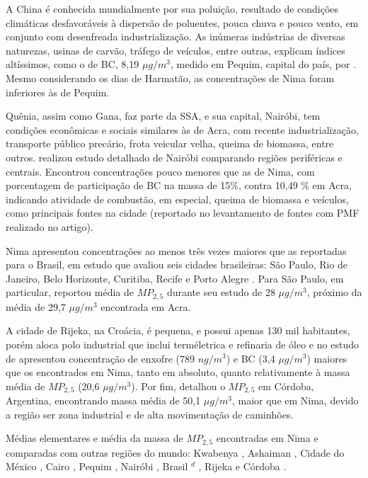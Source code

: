 A China é conhecida mundialmente por sua poluição, resultado de condições
climáticas desfavoráveis à dispersão de poluentes, pouca chuva e pouco vento, 
em conjunto com desenfreada industrialização. As inúmeras indústrias
de diversas naturezas, usinas de carvão, tráfego de veículos, entre outras, 
explicam índices altíssimos, como o de BC, 8,19 $\mu g/m^3$, 
medido em Pequim, capital do país, por \citet{yang2011}. Mesmo considerando 
os dias de Harmatão, as concentrações de Nima foram inferiores às de Pequim.

Quênia, assim como Gana, faz parte da SSA, e sua capital, Nairóbi, tem condições
econômicas e sociais similares às de Acra, com recente industrialização, 
transporte público precário, frota veicular velha, queima de biomassa, 
entre outros.  
\citet{gaita2014} realizou estudo detalhado de Nairóbi comparando regiões 
periféricas e centrais. Encontrou concentrações pouco menores que as de Nima, 
com porcentagem de participação de BC na massa de 15\%, contra 10,49 \% em Acra,
indicando atividade de combustão, em especial, queima de biomassa e veículos, 
como principais fontes na cidade 
(reportado no levantamento de fontes com PMF realizado no artigo). 

Nima apresentou concentrações ao menos três vezes maiores que as reportadas 
para o Brasil, em estudo que avaliou seis cidades brasileiras: São Paulo, 
Rio de Janeiro, Belo Horizonte, Curitiba, Recife e Porto Alegre
\citep{andrade2012urban}. Para São Paulo, em particular, \citet{andrade2012}
reportou média de $MP_{2,5}$ durante seu estudo de 28 $\mu g / m^3$, 
próximo da média de 29,7 $\mu g / m^3$ encontrada em Acra. 

A cidade de Rijeka, na Croácia, é pequena, e possui apenas 130 mil habitantes, 
porém aloca polo industrial que inclui terméletrica e refinaria de óleo
e no estudo de \citet{ivovsevic2015} apresentou concentração de enxofre
(789 $ng / m^3$) e BC (3,4 $\mu g / m^3$) maiores que os encontrados em Nima, 
tanto em absoluto, quanto relativamente à massa média de $MP_{2,5}$ 
(20,6 $\mu g / m^3$). 
Por fim, \citet{achad2014} detalhou o $MP_{2,5}$ em Córdoba, Argentina, 
encontrando massa média de 50,1 $\mu g / m^3$, maior que em Nima, devido a 
região ser zona industrial e de alta movimentação de caminhões.   

\begin{landscape}
  \begin{table}[H]
    \centering
    \caption{Médias elementares e média da massa de $MP_{2,5}$ encontradas
             em Nima e comparadas com outras regiões do mundo:
             Kwabenya \citep{aboh2009},
             Ashaiman \citep{ofosu2012},
             Cidade do México \citep{diaz2014},
             Cairo  \citep{boman2013},
             Pequim  \citep{yang2011},
             Nairóbi   \citep{gaita2014},
             Brasil $^d$ \citep{andrade2012urban},
             Rijeka  \citep{ivovsevic2015} e
             Córdoba \citep{achad2014}.
             \label{table:fino_in_the_world}}
    
  \end{table} 
\end{landscape}

